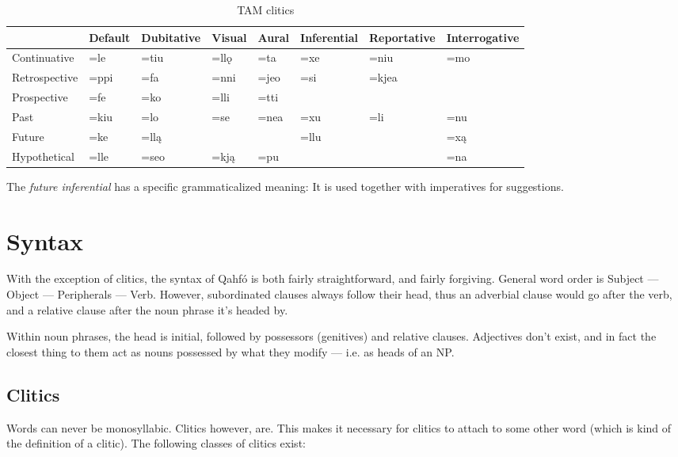 \documentclass{article}
\newcommand{\langname}{Qahfó}
\begin{document}
\begin{table}[H]
\begin{tabular}{l|lllllll}
              & Default & Dubitative & Visual & Aural & Inferential & Reportative & Interrogative \\ \hline
Continuative  & =le     & =tiu       & =llǫ   & =ta   & =xe         & =niu   & =mo     \\
Retrospective & =ppi    & =fa        & =nni   & =jeo  & =si         & =kjea   &     \\
Prospective   & =fe     & =ko        & =lli   & =tti  &             &       &       \\
Past          & =kiu    & =lo        & =se    & =nea  & =xu         & =li     & =nu    \\
Future        & =ke     & =llą       &        &       &   =llu          &       & =xą      \\
Hypothetical  & =lle    & =seo       & =kją   & =pu   &             &      &  =na
\end{tabular}
\caption{TAM clitics}
\label{tamcl}
\end{table}

The \emph{future inferential} has a specific grammaticalized meaning: It is used together with imperatives for suggestions.



 
\newpage
\section{Syntax}
With the exception of clitics, the syntax of \langname{} is both fairly straightforward, and fairly forgiving. General word order is Subject — Object — Peripherals — Verb. However, subordinated clauses always follow their head, thus an adverbial clause would go after the verb, and a relative clause after the noun phrase it’s headed by.

Within noun phrases, the head is initial, followed by possessors (genitives) and relative clauses. Adjectives don’t exist, and in fact the closest thing to them act as nouns possessed by what they modify — i.e. as heads of an NP. 

\subsection{Clitics} \label{ssec:clitics}
Words can never be monosyllabic. Clitics however, are. This makes it necessary for clitics to attach to some other word (which is kind of the definition of a clitic). The following classes of clitics exist:
\end{document}
